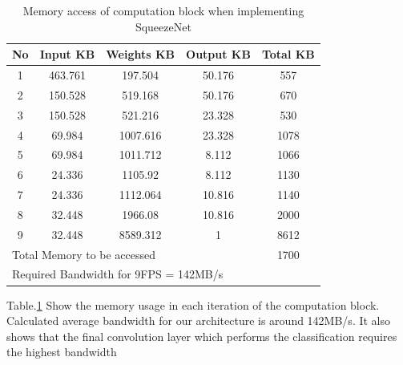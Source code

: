 \documentclass[conference]{IEEEtran}
\begin{document}
\begin{table}[]
\caption{Memory access of computation block when implementing SqueezeNet}
\begin{tabular}{|c|c|c|c|c|}
\hline
No    & Input KB    & Weights KB    & Output KB   & Total KB \\ \hline
1     & 463.761     & 197.504       & 50.176      & 557      \\ \hline
2     & 150.528     & 519.168       & 50.176      & 670      \\ \hline
3     & 150.528     & 521.216       & 23.328      & 530      \\ \hline
4     & 69.984      & 1007.616      & 23.328      & 1078     \\ \hline
5     & 69.984      & 1011.712      & 8.112       & 1066     \\ \hline
6     & 24.336      & 1105.92       & 8.112       & 1130     \\ \hline
7     & 24.336      & 1112.064      & 10.816      & 1140     \\ \hline
8     & 32.448      & 1966.08       & 10.816      & 2000     \\ \hline
9     & 32.448      & 8589.312      & 1           & 8612     \\ \hline
\multicolumn{4}{|l|}{Total Memory to be accessed} & 1700     \\ \hline
\multicolumn{5}{|l|}{Required Bandwidth for 9FPS = 142MB/s}  \\ \hline
\end{tabular}
\label{tab3}
\end{table}


Table.\ref{tab3} Show the memory usage in each iteration of the computation block. Calculated average bandwidth for our architecture is around 142MB/s. It also shows that the final convolution layer which performs the classification requires the highest bandwidth

\end{document}
